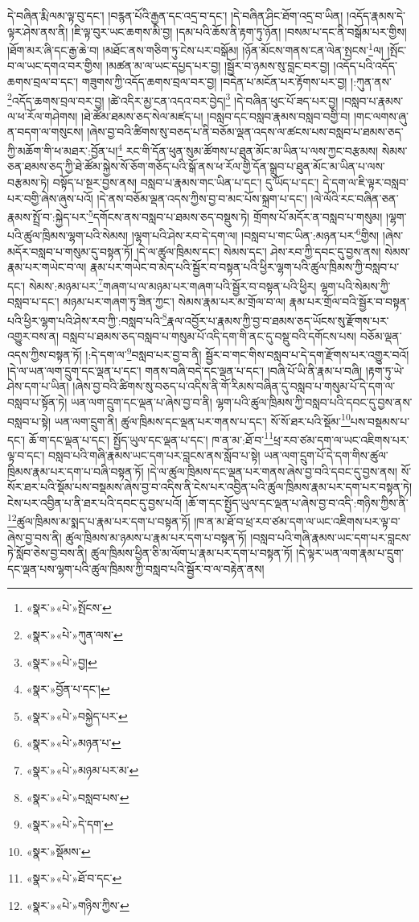 དེ་བཞིན་རྨི་ལམ་ལྟ་བུ་དང་། །བརྙན་པོའི་རྒྱན་དང་འདྲ་བ་དང་། །དེ་བཞིན་ཤིང་ཐོག་འདྲ་བ་ཡིན། །འདོད་རྣམས་དེ་ལྟར་ཤེས་ནས་ནི། །ཇི་ལྟ་བུར་ཡང་ཆགས་མི་བྱ། །དམ་པའི་ཆོས་ནི་རྟག་ཏུ་ཉོན། །བསམ་པ་དང་ནི་བསྒོམ་པར་གྱིས། །ཐོག་མར་ཞི་དང་རྒྱ་ཆེ་བ། །མཐོང་ནས་གཅིག་ཏུ་ངེས་པར་བསྒོམ། །ཉོན་མོངས་གནས་ངན་ལེན་སྤངས་\footnote{«སྣར་»«པེ་»སྤོངས་}ལ། །སྤོང་བ་ལ་ཡང་དགའ་བར་གྱིས། །མཚན་མ་ལ་ཡང་དཔྱད་པར་བྱ། །སྦྱོར་བ་ཉམས་སུ་བླང་བར་བྱ། །འདོད་པའི་འདོད་ཆགས་བྲལ་བ་དང་། གཟུགས་ཀྱི་འདོད་ཆགས་བྲལ་བར་བྱ། །བདེན་པ་མངོན་པར་རྟོགས་པར་བྱ། །:ཀུན་ནས་\footnote{«སྣར་»«པེ་»ཀུན་ལས་}འདོད་ཆགས་བྲལ་བར་བྱ། །ཚེ་འདིར་མྱ་ངན་འདའ་བར་བྱེད།\footnote{«སྣར་»«པེ་»བྱ།} །དེ་བཞིན་ཕུང་པོ་ཟད་པར་བྱ། །བསླབ་པ་རྣམས་ལ་ཕ་རོལ་གཤེགས། །ཐེ་ཚོམ་ཐམས་ཅད་སེལ་མཛད་པ། །བསླབ་དང་བསླབ་རྣམས་བསླབ་བགྱི་བ། །གང་ལགས་ཞུ་ན་བདག་ལ་གསུངས། །ཞེས་བྱ་བའི་ཚིགས་སུ་བཅད་པ་ནི་བཅོམ་ལྡན་འདས་ལ་ཚངས་པས་བསླབ་པ་ཐམས་ཅད་ཀྱི་མཆོག་གི་ཕ་མཐར་:བྱོན་པ།\footnote{«སྣར་»བྱོན་པ་དང་།} རང་གི་དོན་ཕུན་སུམ་ཚོགས་པ་ཐུན་མོང་མ་ཡིན་པ་ལས་ཀྱང་བརྩམས། སེམས་ཅན་ཐམས་ཅད་ཀྱི་ཐེ་ཚོམ་སྐྱེས་སོ་ཅོག་གཅོད་པའི་སྒོ་ནས་ཕ་རོལ་གྱི་དོན་སྒྲུབ་པ་ཐུན་མོང་མ་ཡིན་པ་ལས་བརྩམས་ཏེ། བསྟོད་པ་སྔར་བྱས་ནས། བསླབ་པ་རྣམས་གང་ཡིན་པ་དང་། དུ་ཡོད་པ་དང་། དེ་དག་ལ་ཇི་ལྟར་བསླབ་པར་བགྱི་ཞེས་ཞུས་པའོ། །དེ་ནས་བཅོམ་ལྡན་འདས་ཀྱིས་བྱ་བ་མང་པོས་སྐྲག་པ་དང་། །ལེ་ལོའི་རང་བཞིན་ཅན་རྣམས་སྤྲོ་བ་:སྐྱེད་པར་\footnote{«སྣར་»«པེ་»བསྐྱེད་པར་}དགོངས་ནས་བསླབ་པ་ཐམས་ཅད་བསྡུས་ཏེ། གྲོགས་པོ་མདོར་ན་བསླབ་པ་གསུམ། །ལྷག་པའི་ཚུལ་ཁྲིམས་ལྷག་པའི་སེམས། །ལྷག་པའི་ཤེས་རབ་དེ་དག་ལ། །བསླབ་པ་གང་ཡིན་:མཉན་པར་\footnote{«སྣར་»«པེ་»མཉན་པ་}གྱིས། །ཞེས་མདོར་བསླབ་པ་གསུམ་དུ་བསྟན་ཏོ། །དེ་ལ་ཚུལ་ཁྲིམས་དང་། སེམས་དང་། ཤེས་རབ་ཀྱི་དབང་དུ་བྱས་ནས། སེམས་རྣམ་པར་གཡེང་བ་ལ། རྣམ་པར་གཡེང་བ་མེད་པའི་སྦྱོར་བ་བསྟན་པའི་ཕྱིར་ལྷག་པའི་ཚུལ་ཁྲིམས་ཀྱི་བསླབ་པ་དང་། སེམས་:མཉམ་པར་\footnote{«སྣར་»«པེ་»མཉམ་པར་མ་}གཞག་པ་ལ་མཉམ་པར་གཞག་པའི་སྦྱོར་བ་བསྟན་པའི་ཕྱིར། ལྷག་པའི་སེམས་ཀྱི་བསླབ་པ་དང་། མཉམ་པར་གཞག་ཏུ་ཟིན་ཀྱང་། སེམས་རྣམ་པར་མ་གྲོལ་བ་ལ། རྣམ་པར་གྲོལ་བའི་སྦྱོར་བ་བསྟན་པའི་ཕྱིར་ལྷག་པའི་ཤེས་རབ་ཀྱི་:བསླབ་པའི་\footnote{«སྣར་»«པེ་»བསླབ་པས་}རྣལ་འབྱོར་པ་རྣམས་ཀྱི་བྱ་བ་ཐམས་ཅད་ཡོངས་སུ་རྫོགས་པར་འགྱུར་བས་ན། བསླབ་པ་ཐམས་ཅད་བསླབ་པ་གསུམ་པོ་འདི་དག་གི་ནང་དུ་བསྡུ་བའི་དགོངས་པས། བཅོམ་ལྡན་འདས་ཀྱིས་བསྟན་ཏོ། །:དེ་དག་ལ་\footnote{«སྣར་»«པེ་»དེ་དག་}བསླབ་པར་བྱ་བ་ནི། སྦྱོར་བ་གང་གིས་བསླབ་པ་དེ་དག་རྫོགས་པར་འགྱུར་བའོ། །དེ་ལ་ཡན་ལག་དྲུག་དང་ལྡན་པ་དང་། གནས་བཞི་བདེ་དང་ལྡན་པ་དང་། །བཞི་པོ་ཡི་ནི་རྣམ་པ་བཞི། །རྟག་ཏུ་ཡེ་ཤེས་དག་པ་ཡིན། །ཞེས་བྱ་བའི་ཚིགས་སུ་བཅད་པ་འདིས་ནི་གོ་རིམས་བཞིན་དུ་བསླབ་པ་གསུམ་པོ་དེ་དག་ལ་བསླབ་པ་སྟོན་ཏེ། ཡན་ལག་དྲུག་དང་ལྡན་པ་ཞེས་བྱ་བ་ནི། ལྷག་པའི་ཚུལ་ཁྲིམས་ཀྱི་བསླབ་པའི་དབང་དུ་བྱས་ནས་བསླབ་པ་སྟེ། ཡན་ལག་དྲུག་ནི། ཚུལ་ཁྲིམས་དང་ལྡན་པར་གནས་པ་དང་། སོ་སོ་ཐར་པའི་སྡོམ་\footnote{«སྣར་»སྡོམས་}པས་བསྡམས་པ་དང་། ཆོ་ག་དང་ལྡན་པ་དང་། སྤྱོད་ཡུལ་དང་ལྡན་པ་དང་། ཁ་ན་མ་:ཐོ་བ་\footnote{«སྣར་»«པེ་»ཐོ་བ་དང་}ཕྲ་རབ་ཙམ་དག་ལ་ཡང་འཇིགས་པར་ལྟ་བ་དང་། བསླབ་པའི་གཞི་རྣམས་ཡང་དག་པར་བླངས་ནས་སློབ་པ་སྟེ། ཡན་ལག་དྲུག་པོ་དེ་དག་གིས་ཚུལ་ཁྲིམས་རྣམ་པར་དག་པ་བཞི་བསྟན་ཏོ། །དེ་ལ་ཚུལ་ཁྲིམས་དང་ལྡན་པར་གནས་ཞེས་བྱ་བའི་དབང་དུ་བྱས་ནས། སོ་སོར་ཐར་པའི་སྡོམ་པས་བསྡམས་ཞེས་བྱ་བ་འདིས་ནི་ངེས་པར་འབྱིན་པའི་ཚུལ་ཁྲིམས་རྣམ་པར་དག་པར་བསྟན་ཏེ། ངེས་པར་འབྱིན་པ་ནི་ཐར་པའི་དབང་དུ་བྱས་པའོ། །ཆོ་ག་དང་སྤྱོད་ཡུལ་དང་ལྡན་པ་ཞེས་བྱ་བ་འདི་:གཉིས་ཀྱིས་ནི་\footnote{«སྣར་»«པེ་»གཉིས་ཀྱིས་}ཚུལ་ཁྲིམས་མ་སྨད་པ་རྣམ་པར་དག་པ་བསྟན་ཏོ། །ཁ་ན་མ་ཐོ་བ་ཕྲ་རབ་ཙམ་དག་ལ་ཡང་འཇིགས་པར་ལྟ་བ་ཞེས་བྱ་བས་ནི། ཚུལ་ཁྲིམས་མ་ཉམས་པ་རྣམ་པར་དག་པ་བསྟན་ཏོ། །བསླབ་པའི་གཞི་རྣམས་ཡང་དག་པར་བླངས་ཏེ་སློབ་ཅེས་བྱ་བས་ནི། ཚུལ་ཁྲིམས་ཕྱིན་ཅི་མ་ལོག་པ་རྣམ་པར་དག་པ་བསྟན་ཏོ། །དེ་ལྟར་ཡན་ལག་རྣམ་པ་དྲུག་དང་ལྡན་པས་ལྷག་པའི་ཚུལ་ཁྲིམས་ཀྱི་བསླབ་པའི་སྦྱོར་བ་ལ་བརྟེན་ནས། 